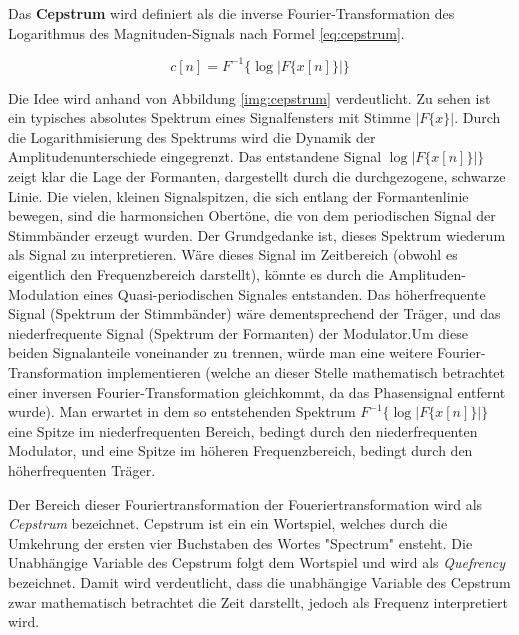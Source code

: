 Das \textbf{Cepstrum} wird definiert als die inverse Fourier-Transformation des Logarithmus des Magnituden-Signals nach Formel \ref{eq:cepstrum}.

\begin{equation}
c[n] = F^{-1}\{\log|F\{x[n]\}|\}
\label{eq:cepstrum}
\end{equation}

Die Idee wird anhand von Abbildung \ref{img:cepstrum} verdeutlicht. Zu sehen ist ein typisches absolutes Spektrum eines Signalfensters mit Stimme $|F\{x\}|$. Durch die Logarithmisierung des Spektrums wird die Dynamik der Amplitudenunterschiede eingegrenzt. Das entstandene Signal $\log|F\{x[n]\}|\}$ zeigt klar die Lage der Formanten, dargestellt durch die durchgezogene, schwarze Linie. Die vielen, kleinen Signalspitzen, die sich entlang der Formantenlinie bewegen, sind die harmonsichen Obertöne, die von dem periodischen Signal der Stimmbänder erzeugt wurden. Der Grundgedanke ist, dieses Spektrum wiederum als Signal zu interpretieren. Wäre dieses Signal im Zeitbereich (obwohl es eigentlich den Frequenzbereich darstellt), könnte es durch die Amplituden-Modulation eines Quasi-periodischen Signales entstanden. Das höherfrequente Signal (Spektrum der Stimmbänder) wäre dementsprechend der Träger, und das niederfrequente Signal (Spektrum der Formanten) der Modulator.Um diese beiden Signalanteile voneinander zu trennen, würde man eine weitere Fourier-Transformation implementieren (welche an dieser Stelle mathematisch betrachtet einer inversen Fourier-Transformation gleichkommt, da das Phasensignal entfernt wurde). Man erwartet in dem so entstehenden Spektrum $F^{-1}\{\log|F\{x[n]\}|\}$ eine Spitze im niederfrequenten Bereich, bedingt durch den niederfrequenten Modulator, und eine Spitze im höheren Frequenzbereich, bedingt durch den höherfrequenten Träger. 

Der Bereich dieser \glqq Fouriertransformation der Foueriertransformation\grqq{} wird als \emph{Cepstrum} bezeichnet. Cepstrum ist ein ein Wortspiel, welches durch die Umkehrung der ersten vier Buchstaben des Wortes "Spectrum" ensteht. Die Unabhängige Variable des Cepstrum folgt dem Wortspiel und wird als \emph{Quefrency} bezeichnet. Damit wird verdeutlicht, dass die unabhängige Variable des Cepstrum zwar mathematisch betrachtet die Zeit darstellt, jedoch als Frequenz interpretiert wird.

